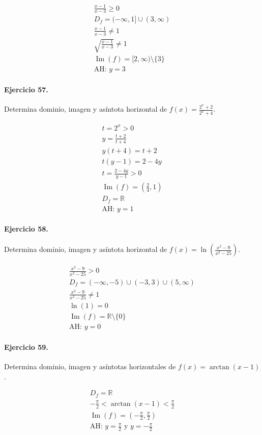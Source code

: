 \documentclass[11pt,a4paper]{article}
\begin{document}
\[
\begin{aligned}
\frac{x-1}{x-3}\ge0\\
D_f=(-\infty,1]\cup(3,\infty)\\
\frac{x-1}{x-3}\ne1\\
\sqrt{\frac{x-1}{x-3}}\ne1\\
\operatorname{Im}(f)=[2,\infty)\setminus\{3\}\\
\text{AH: }y=3
\end{aligned}
\]


\paragraph{Ejercicio 57.} Determina dominio, imagen y asíntota horizontal de $f(x)=\frac{2^x+2}{2^x+4}$. 

\[
\begin{aligned}
t=2^x>0\\
y=\frac{t+2}{t+4}\\
y(t+4)=t+2\\
t(y-1)=2-4y\\
t=\frac{2-4y}{y-1}>0\\
\operatorname{Im}(f)=(\frac{2}{4},1)\\
D_f=\mathbb{R}\\
\text{{AH: }}y=1
\end{aligned}
\]


\paragraph{Ejercicio 58.} Determina dominio, imagen y asíntota horizontal de $f(x)=\ln\left(\frac{x^2-9}{x^2-25}\right)$.

\[
\begin{aligned}
\frac{x^2-9}{x^2-25} >0\\
D_f=(-\infty,-5)\cup(-3,3)\cup(5,\infty)\\
\frac{x^2-9}{x^2-25}\ne1\\
\ln(1)=0\\
\operatorname{Im}(f)=\mathbb{R}\setminus\{0\}\\
\text{{AH: }}y=0
\end{aligned}
\]


\paragraph{Ejercicio 59.} Determina dominio, imagen y asíntotas horizontales de $f(x)=\arctan(x-1)$.

\[
\begin{aligned}
D_f=\mathbb{R}\\
-\frac{\pi}{2}<\arctan(x-1)<\frac{\pi}{2}\\
\operatorname{Im}(f)=\left(-\frac{\pi}{2},\frac{\pi}{2}\right)\\
\text{AH: }y=\frac{\pi}{2}\text{ y }y=-\frac{\pi}{2}
\end{aligned}
\]
\end{document}
